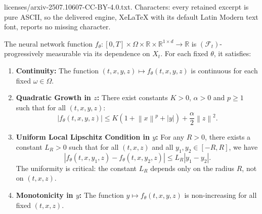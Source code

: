 \documentclass[10pt,a4paper]{amsart}
\newcommand{\Fcal}{\mathcal{F}}
\newcommand{\R}{\mathbb{R}}
\newcommand{\abs}[1]{\left\lvert#1\right\rvert}
\newcommand{\norm}[1]{\left\lVert#1\right\rVert}
\begin{document}
licenses/arxiv-2507.10607-CC-BY-4.0.txt. Characters: every retained excerpt is pure ASCII, so the delivered engine, XeLaTeX with its default Latin Modern text font, reports no missing character.
\begin{assumption}
\label{ass:f_theta_regularity_general}
The neural network function $f_\theta: [0,T] \times \Omega \times \R \times \R^{1 \times d} \to \R$ is $(\Fcal_t)$-progressively measurable via its dependence on $X_t$. For each fixed $\theta$, it satisfies:
\begin{enumerate}[label=(\roman*)]
    \item \textbf{Continuity:} The function $(t,x,y,z) \mapsto f_\theta(t,x,y,z)$ is continuous for each fixed $\omega \in \Omega$.
    \item \textbf{Quadratic Growth in $z$:} There exist constants $K > 0$, $\alpha > 0$ and $p \ge 1$ such that for all $(t,x,y,z)$:
    \[ \abs{f_\theta(t,x,y,z)} \le K(1 + \norm{x}^p + \abs{y}) + \frac{\alpha}{2}\norm{z}^2. \]
    \item \textbf{Uniform Local Lipschitz Condition in $y$:} For any $R>0$, there exists a constant $L_R > 0$ such that for all $(t,x,z)$ and all $y_1, y_2 \in [-R, R]$, we have
    \[ \abs{f_\theta(t,x,y_1,z) - f_\theta(t,x,y_2,z)} \le L_R\abs{y_1-y_2}. \]
    The uniformity is critical: the constant $L_R$ depends only on the radius $R$, not on $(t,x,z)$.
    \item \textbf{Monotonicity in $y$:} The function $y \mapsto f_\theta(t,x,y,z)$ is non-increasing for all fixed $(t,x,z)$.
\end{enumerate}
\end{assumption}
\end{document}
